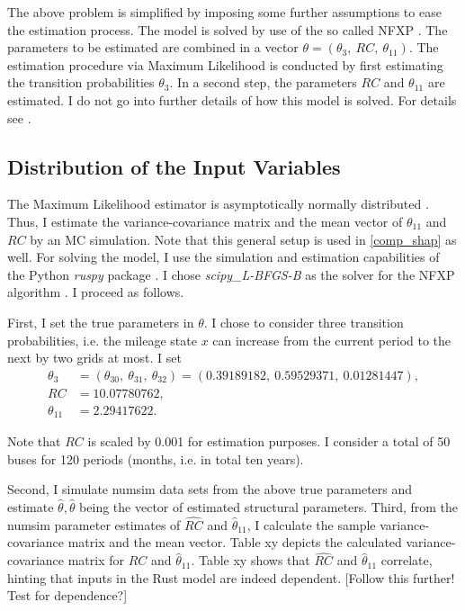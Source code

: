 The above problem is simplified by imposing some further assumptions to ease the estimation process. The model is solved by use of the so called NFXP \citep{R87}. The parameters to be estimated are combined in a vector $\theta=(\theta_3,\ RC,\ \theta_{11}) $. The estimation procedure via Maximum Likelihood is conducted by first estimating the transition probabilities $\theta_3$. In a second step, the parameters $RC$ and $\theta_{11}$ are estimated. I do not go into further details of how this model is solved. For details see \citet{R87}.

\subsection{Distribution of the Input Variables}

The Maximum Likelihood estimator is asymptotically normally distributed \citep{R73}. Thus, I estimate the variance-covariance matrix and the mean vector of $\theta_{11}$ and $RC$ by an MC simulation. Note that this general setup is used in \cref{comp_shap} as well. For solving the model, I use the simulation and estimation capabilities of the Python \textit{ruspy} package \citep{OSE19}. I chose \textit{scipy\_L-BFGS-B} as the solver for the NFXP algorithm \citep{SP20}. I proceed as follows.

First, I set the true parameters in $\theta$. I chose to consider three transition probabilities, i.e. the mileage state $x$ can increase from the current period to the next by two grids at most. I set
\begin{align*}
\theta_3 &= (\theta_{30},\ \theta_{31},\ \theta_{32})=(0.39189182,\ 0.59529371,\ 0.01281447),\\
RC &= 10.07780762,\\
\theta_{11} &= 2.29417622.
\end{align*}

\noindent Note that $RC$ is scaled by 0.001 for estimation purposes. I consider a total of 50 buses for 120 periods (months, i.e. in total ten years).

Second, I simulate numsim data sets from the above true parameters and estimate $\hat{\theta}, \hat{\theta}$ being the vector of estimated structural parameters.
Third, from the numsim parameter estimates of $\widehat{RC}$ and ${\hat{\theta}}_{11}$, I calculate the sample variance-covariance matrix and the mean vector. Table xy depicts the calculated variance-covariance matrix for $\widehat{RC}$ and ${\hat{\theta}}_{11}$. Table xy shows that $\widehat{RC}$ and ${\hat{\theta}}_{11}$ correlate, hinting that inputs in the Rust model are indeed dependent.
[Follow this further! Test for dependence?]

